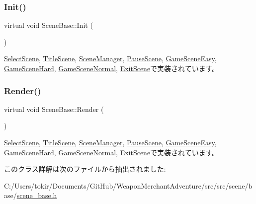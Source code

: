 \subsubsection{\texorpdfstring{Init()}{Init()}}
{\footnotesize\ttfamily virtual void Scene\+Base\+::\+Init (\begin{DoxyParamCaption}{ }\end{DoxyParamCaption})\hspace{0.3cm}{\ttfamily [pure virtual]}}



\mbox{\hyperlink{class_select_scene_a20b3a902b5521d7494ed353731b3065d}{Select\+Scene}}, \mbox{\hyperlink{class_title_scene_a3d039e7db0fa1e22e8c36d3cedfbd318}{Title\+Scene}}, \mbox{\hyperlink{class_scene_manager_a6c0e84d0e76f23fb3172839dba5f091b}{Scene\+Manager}}, \mbox{\hyperlink{class_pause_scene_ad2df77966e0ac9ef6dfa99e416498183}{Pause\+Scene}}, \mbox{\hyperlink{class_game_scene_easy_a837e9b0c8227dca2d14f975a8f007ed1}{Game\+Scene\+Easy}}, \mbox{\hyperlink{class_game_scene_hard_affc2e6a09c13a625730eeb0e742cb22a}{Game\+Scene\+Hard}}, \mbox{\hyperlink{class_game_scene_normal_ac3f3e52cf1c24802035f38fccb221fd3}{Game\+Scene\+Normal}}, \mbox{\hyperlink{class_exit_scene_a10f6018b0c4c639d0e8756885dbc834c}{Exit\+Scene}}で実装されています。

\mbox{\label{class_scene_base_ad981674ce731ea267f398e889bbb9dc3}} 
\subsubsection{\texorpdfstring{Render()}{Render()}}
{\footnotesize\ttfamily virtual void Scene\+Base\+::\+Render (\begin{DoxyParamCaption}{ }\end{DoxyParamCaption})\hspace{0.3cm}{\ttfamily [pure virtual]}}



\mbox{\hyperlink{class_select_scene_a85445536ad84d5232c724ecb7d48b8aa}{Select\+Scene}}, \mbox{\hyperlink{class_title_scene_af12c59b3bf9458640938c5ca620527ae}{Title\+Scene}}, \mbox{\hyperlink{class_scene_manager_a968ae7a0065b793f139bda6bcc58d106}{Scene\+Manager}}, \mbox{\hyperlink{class_pause_scene_a4eeb70d814edbe91a10e315c5e9942df}{Pause\+Scene}}, \mbox{\hyperlink{class_game_scene_easy_ad2cbe509b1f81f0e3b4d1656466dabd3}{Game\+Scene\+Easy}}, \mbox{\hyperlink{class_game_scene_hard_ab4d10e5fc6e39746f80ef967d6a02eae}{Game\+Scene\+Hard}}, \mbox{\hyperlink{class_game_scene_normal_a1f0ef0b5b194f9f9e7bf857cca7acc39}{Game\+Scene\+Normal}}, \mbox{\hyperlink{class_exit_scene_aecf5de52db863695794ee0b0e68a4ad0}{Exit\+Scene}}で実装されています。



このクラス詳解は次のファイルから抽出されました\+:\begin{DoxyCompactItemize}
\item 
C\+:/\+Users/tokir/\+Documents/\+Git\+Hub/\+Weapon\+Merchant\+Adventure/src/src/scene/base/\mbox{\hyperlink{scene__base_8h}{scene\+\_\+base.\+h}}\end{DoxyCompactItemize}
